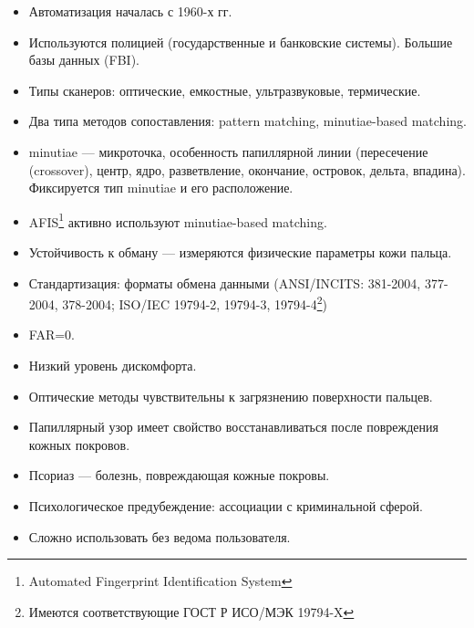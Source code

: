 \begin{frame}[allowframebreaks]
\begin{itemize}
    \item Автоматизация началась с 1960-х гг.
    \item Используются полицией (государственные и банковские системы). Большие базы данных (FBI).
    \item Типы сканеров: оптические, емкостные, ультразвуковые, термические.
    \item Два типа методов сопоставления: pattern matching, minutiae-based matching.
    \item minutiae --- микроточка, особенность папиллярной линии (пересечение (crossover), центр, ядро, разветвление, окончание, островок, дельта, впадина). Фиксируется тип minutiae и его расположение.
    \item AFIS\footnote{Automated Fingerprint Identification System} активно используют minutiae-based matching.
    \item Устойчивость к обману --- измеряются физические параметры кожи пальца.
    \item Стандартизация: форматы обмена данными (ANSI/INCITS: 381-2004, 377-2004, 378-2004; ISO/IEC 19794-2, 19794-3, 19794-4\footnote{Имеются соответствующие ГОСТ Р ИСО/МЭК 19794-X}) 
    \item FAR=0.
    \item Низкий уровень дискомфорта.
    \item Оптические методы чувствительны к загрязнению поверхности пальцев.
    \item Папиллярный узор имеет свойство восстанавливаться после повреждения кожных покровов. 
    \item Псориаз --- болезнь, повреждающая кожные покровы.
    \item Психологическое предубеждение: ассоциации с криминальной сферой.
    \item Сложно использовать без ведома пользователя.
\end{itemize}
\end{frame}


